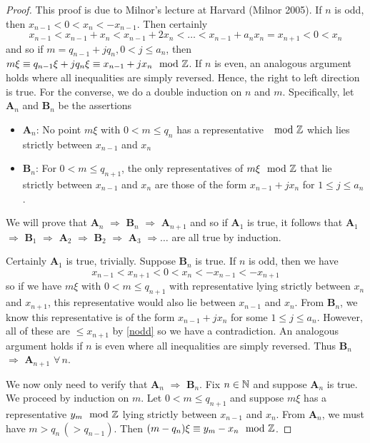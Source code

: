 \documentclass[../main.tex]{subfiles}
\begin{document}
\begin{proof}
This proof is due to Milnor's lecture at Harvard (Milnor 2005). 
If $n$ is odd, then $x_{n-1} < 0 < x_{n} < -x_{n-1}$. Then certainly
\begin{equation}\label{nodd}
   x_{n-1} < x_{n-1} + x_{n} < x_{n-1} + 2x_{n} < \dots < x_{n-1} + a_{n}x_{n} = x_{n+1} < 0 < x_{n} 
\end{equation}
and so if $m = q_{n-1} + jq_{n}, 0 < j \leq a_{n}$, then $m\xi \equiv q_{n-1}\xi + jq_{n}\xi \equiv x_{n-1} + jx_{n} \mod{\mathbb{Z}}$. If $n$ is even, an analogous argument holds where all inequalities are simply reversed. Hence, the right to left direction is true. For the converse, we do a double induction on $n$ and $m$. Specifically, let \textbf{A$_{n}$} and \textbf{B$_{n}$} be the assertions
\begin{itemize}
    \item[] \textbf{A$_{n}$}: No point $m\xi$ with $0 < m \leq q_{n}$ has a representative $\mod{\mathbb{Z}}$ which lies strictly between $x_{n-1}$ and $x_{n}$
    \item[] \textbf{B$_{n}$}: For $0 < m \leq q_{n+1}$, the only representatives of $m\xi \mod {\mathbb{Z}}$ that lie strictly between $x_{n-1}$ and $x_{n}$ are those of the form $x_{n-1} + jx_{n}$ for $1\leq j \leq a_{n}$. 
\end{itemize}
We will prove that \textbf{A$_{n}$} $\Longrightarrow$ \textbf{B$_{n}$} $\Longrightarrow$ \textbf{A$_{n+1}$} and so if \textbf{A$_{1}$} is true, it follows that \textbf{A$_{1}$} $\Longrightarrow$ \textbf{B$_{1}$} $\Longrightarrow$ \textbf{A$_{2}$} $\Longrightarrow$ \textbf{B$_{2}$} $\Longrightarrow$ \textbf{A$_{3}$} $\Longrightarrow \dots$ are all true by induction.

Certainly \textbf{A$_{1}$} is true, trivially. Suppose \textbf{B$_{n}$} is true. If $n$ is odd, then we have 
\[
x_{n-1} < x_{n+1} < 0 < x_{n} < -x_{n-1} < -x_{n+1}
\]
so if we have $m\xi$ with $0 < m \leq q_{n+1}$ with representative lying strictly between $x_{n}$ and $x_{n+1}$, this representative would also lie between $x_{n-1}$ and $x_{n}$. From \textbf{B$_{n}$}, we know this representative is of the form $x_{n-1} + jx_{n}$ for some $1\leq j \leq a_{n}$. However, all of these are $\leq x_{n+1}$ by \eqref{nodd} so we have a contradiction. An analogous argument holds if $n$ is even where all inequalities are simply reversed. Thus \textbf{B$_{n}$} $\Longrightarrow$ \textbf{A$_{n+1}$} $\forall\, n$. 

We now only need to verify that \textbf{A$_{n}$} $\Longrightarrow$ \textbf{B$_{n}$}. Fix $n \in \mathbb{N}$ and suppose \textbf{A$_{n}$} is true. We proceed by induction on $m$. Let  $0 < m \leq q_{n+1}$ and suppose $m\xi$ has a representative $y_{m} \mod{\mathbb{Z}}$ lying strictly between $x_{n-1}$ and $x_{n}$. From \textbf{A$_{n}$}, we must have $m > q_{n}\, (> q_{n-1})$. Then $(m-q_{n})\xi \equiv y_{m} - x_{n} \mod{\mathbb{Z}}$.


\end{proof}
\end{document}
